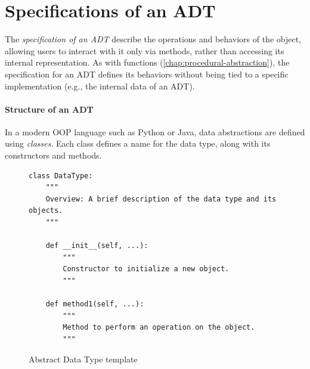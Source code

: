 \documentclass[oneside,11pt,dvipsnames]{book}
\begin{document}



\section{Specifications of an ADT}\label{sec:specs-adt}

The \emph{specification of an ADT} describe the operations and behaviors of the object, allowing users to interact with it only via methods, rather than accessing its internal representation. 
As with functions (\autoref{chap:procedural-abstraction}), the specification for an ADT defines its behaviors without being tied to a specific implementation (e.g., the internal data of an ADT).


\paragraph{Structure of an ADT} In a modern OOP language such as Python or Java, data abstractions are defined using \emph{classes}. Each class defines a name for the data type, along with its constructors and methods.

\begin{figure}
    \begin{lstlisting}
class DataType:
    """
    Overview: A brief description of the data type and its objects.
    """

    def __init__(self, ...):
        """
        Constructor to initialize a new object.
        """

    def method1(self, ...):
        """
        Method to perform an operation on the object.
        """
    \end{lstlisting}
    \caption{Abstract Data Type template}\label{ex:adt-template}
\end{figure}
\end{document}
